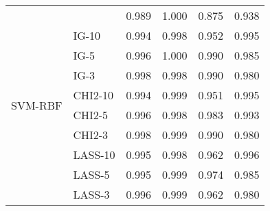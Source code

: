 \begin{table}[h!]
\begin{tabular}{llcccc}
    \midrule
    \multirow{10}{*}{SVM-RBF}
                        &                 & 0.989             & 1.000                & 0.875                & 0.938        \\
                        & IG-10           & 0.994             & 0.998                & 0.952                & 0.995        \\
                        & IG-5            & 0.996             & 1.000                & 0.990                & 0.985        \\
                        & IG-3            & 0.998             & 0.998                & 0.990                & 0.980        \\
                        & CHI2-10         & 0.994             & 0.999                & 0.951                & 0.995        \\
                        & CHI2-5          & 0.996             & 0.998                & 0.983                & 0.993        \\
                        & CHI2-3          & 0.998             & 0.999                & 0.990                & 0.980        \\
                        & LASS-10         & 0.995             & 0.998                & 0.962                & 0.996        \\
                        & LASS-5          & 0.995             & 0.999                & 0.974                & 0.985        \\
                        & LASS-3          & 0.996             & 0.999                & 0.962                & 0.980        \\


\end{tabular}
\end{table}
